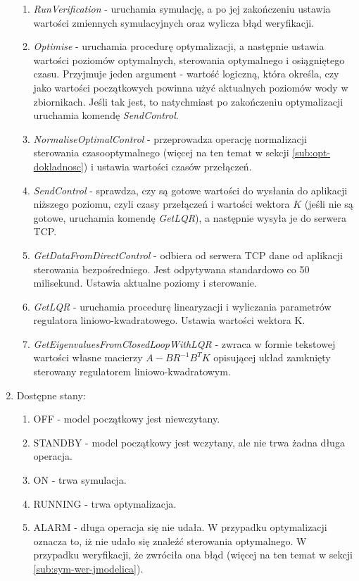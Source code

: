\begin{enumerate}
\begin{enumerate}
        \item \emph{RunVerification} - uruchamia symulację, a po jej zakończeniu ustawia wartości zmiennych symulacyjnych oraz wylicza błąd weryfikacji.
        \item \emph{Optimise} - uruchamia procedurę optymalizacji, a następnie ustawia wartości poziomów optymalnych, sterowania optymalnego i osiągniętego czasu. Przyjmuje jeden argument - wartość logiczną, która określa, czy jako wartości początkowych powinna użyć aktualnych poziomów wody w zbiornikach. Jeśli tak jest, to natychmiast po zakończeniu optymalizacji uruchamia komendę \emph{SendControl}.
        \item \emph{NormaliseOptimalControl} - przeprowadza operację normalizacji sterowania czasooptymalnego (więcej na ten temat w sekcji \ref{sub:opt-dokladnosc}) i ustawia wartości czasów przełączeń.
        \item \emph{SendControl} - sprawdza, czy są gotowe wartości do wysłania do aplikacji niższego poziomu, czyli czasy przełączeń i wartości wektora $K$ (jeśli nie są gotowe, uruchamia komendę \emph{GetLQR}), a następnie wysyła je do serwera TCP.
        \item \emph{GetDataFromDirectControl} - odbiera od serwera TCP dane od aplikacji sterowania bezpośredniego. Jest odpytywana standardowo co 50 milisekund. Ustawia aktualne poziomy i sterowanie.
        \item \emph{GetLQR} - uruchamia procedurę linearyzacji i wyliczania parametrów regulatora liniowo-kwadratowego. Ustawia wartości wektora K.
        \item \emph{GetEigenvaluesFromClosedLoopWithLQR} - zwraca w formie tekstowej wartości własne macierzy $A - BR^{-1}B^{T}K$ opisującej układ zamknięty sterowany regulatorem liniowo-kwadratowym.
    \end{enumerate}
    \item Dostępne stany:
    \begin{enumerate}
        \item OFF - model początkowy jest niewczytany.
        \item STANDBY - model początkowy jest wczytany, ale nie trwa żadna długa operacja.
        \item ON - trwa symulacja.
        \item RUNNING - trwa optymalizacja.
        \item ALARM - długa operacja się nie udała. W przypadku optymalizacji oznacza to, iż nie udało się znaleźć sterowania optymalnego. W przypadku weryfikacji, że zwróciła ona błąd (więcej na ten temat w sekcji \ref{sub:sym-wer-jmodelica}).
    \end{enumerate}
\end{enumerate}

